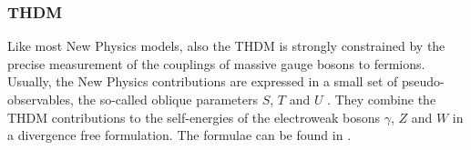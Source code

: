 \documentclass[preprint,3p,12pt]{elsarticle}
\begin{document}

\subsubsection{THDM}

Like most New Physics models, also the THDM is strongly constrained by the precise measurement of the couplings of massive gauge bosons to fermions. Usually, the New Physics contributions are expressed in a small set of pseudo-observables, the so-called oblique parameters $S$, $T$ and $U$ \cite{Peskin:1990zt,Peskin:1991sw}. They combine the THDM contributions to the self-energies of the electroweak bosons $\gamma$, $Z$ and $W$ in a divergence free formulation. The formulae can be found in \cite{Haber:1993wf}.
\end{document}

